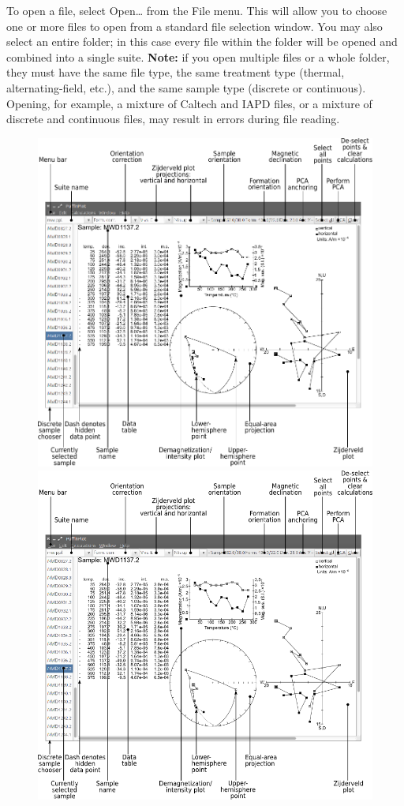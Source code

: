 \documentclass[a4paper,british]{article}
\newcommand{\caps}[1]{\MakeTextUppercase{#1}} %
\begin{document}
To open a file, select \textsf{Open\ldots} from the \textsf{File} menu.
This will allow you to choose one or more files to open from a standard
file selection window. You may also select an entire folder; in this
case every file within the folder will be opened and combined into a
single suite. \textbf{Note:} if you open multiple files or a whole
folder, they must have the same file type, the same treatment type
(thermal, alternating-field, etc.), and the same sample type (discrete
or continuous). Opening, for example, a mixture of Caltech and
\caps{iapd} files, or a mixture of discrete and continuous files, may
result in errors during file reading.

\begin{figure}[htbp]
\centering
\ifpdf\includegraphics{figures/annot-scrnshot.pdf}
\else\includegraphics{figures/annot-scrnshot.png}

\end{figure}
\end{document}
